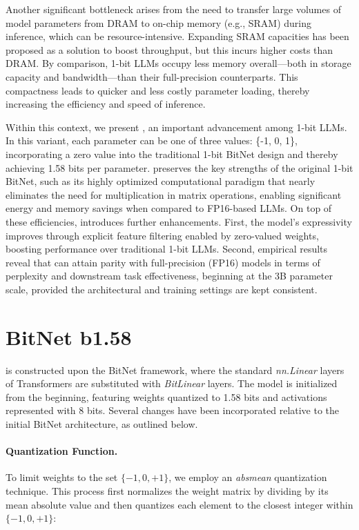 Another significant bottleneck arises from the need to transfer large volumes of model parameters from DRAM to on-chip memory (e.g., SRAM) during inference, which can be resource-intensive. Expanding SRAM capacities has been proposed as a solution to boost throughput, but this incurs higher costs than DRAM. By comparison, 1-bit LLMs occupy less memory overall—both in storage capacity and bandwidth—than their full-precision counterparts. This compactness leads to quicker and less costly parameter loading, thereby increasing the efficiency and speed of inference.

Within this context, we present \textbf{}, an important advancement among 1-bit LLMs. In this variant, each parameter can be one of three values: \{-1, 0, 1\}, incorporating a zero value into the traditional 1-bit BitNet design and thereby achieving 1.58 bits per parameter.  preserves the key strengths of the original 1-bit BitNet, such as its highly optimized computational paradigm that nearly eliminates the need for multiplication in matrix operations, enabling significant energy and memory savings when compared to FP16-based LLMs. On top of these efficiencies,  introduces further enhancements. First, the model’s expressivity improves through explicit feature filtering enabled by zero-valued weights, boosting performance over traditional 1-bit LLMs. Second, empirical results reveal that  can attain parity with full-precision (FP16) models in terms of perplexity and downstream task effectiveness, beginning at the 3B parameter scale, provided the architectural and training settings are kept consistent.

\section{BitNet b1.58}

 is constructed upon the BitNet framework, where the standard \emph{nn.Linear} layers of Transformers are substituted with \emph{BitLinear} layers. The model is initialized from the beginning, featuring weights quantized to 1.58 bits and activations represented with 8 bits. Several changes have been incorporated relative to the initial BitNet architecture, as outlined below.

\paragraph{Quantization Function.} To limit weights to the set $\{-1, 0, +1\}$, we employ an \emph{absmean} quantization technique. This process first normalizes the weight matrix by dividing by its mean absolute value and then quantizes each element to the closest integer within $\{-1, 0, +1\}$:

